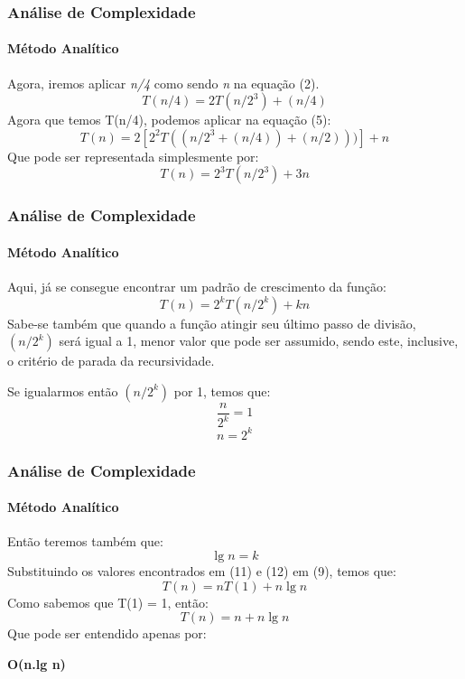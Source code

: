 \documentclass[aspectratio=169]{beamer}
\begin{document}
\begin{frame}
	\frametitle{Análise de Complexidade}
	\framesubtitle{Método Analítico}
	Agora, iremos aplicar \textit{n/4} como sendo \textit{n} na equação (2).
	\begin{equation}
	T(n/4) = 2T(n/2^{3}) + (n/4)
	\end{equation}
	Agora que temos T(n/4), podemos aplicar na equação (5):
	\begin{equation}
	T(n) = 2[2^{2}T((n/2^{3}+ (n/4)) + (n/2)))] + n
	\end{equation}
	Que pode ser representada simplesmente por:
	\begin{equation}
	T(n) = 2^{3}T(n/2^{3}) + 3n
	\end{equation}
\end{frame}

\begin{frame}
	\frametitle{Análise de Complexidade}
	\framesubtitle{Método Analítico}
	Aqui, já se consegue encontrar um padrão de crescimento da função:
	\begin{equation}
	T(n) = 2^{k}T(n/2^{k}) + kn
	\end{equation}
	Sabe-se também que quando a função atingir seu último passo de divisão, $(n/2^{k})$ será igual a 1, menor valor que pode ser assumido, sendo este, inclusive, o critério de parada da recursividade.
	
	Se igualarmos então $(n/2^{k})$ por 1, temos que:
	\begin{equation}
	\frac{n}{2^{k}} = 1 
	\end{equation}
	\begin{equation}
	n = 2^{k}
	\end{equation}
\end{frame}
	\begin{frame}
		\frametitle{Análise de Complexidade}
		\framesubtitle{Método Analítico}
		Então teremos também que:
		\begin{equation}
		\lg n = k
		\end{equation}
		Substituindo os valores encontrados em (11) e (12) em (9), temos que:
		\begin{equation}
		T(n) = nT(1) + n\lg n
		\end{equation}
		Como sabemos que T(1) = 1, então:
		\begin{equation}
		T(n) = n + n\lg n
		\end{equation}
		Que pode ser entendido apenas por:

		\begin{center}
			\textbf{O(n.lg n)}	
		\end{center}

	\end{frame}
\end{document}
